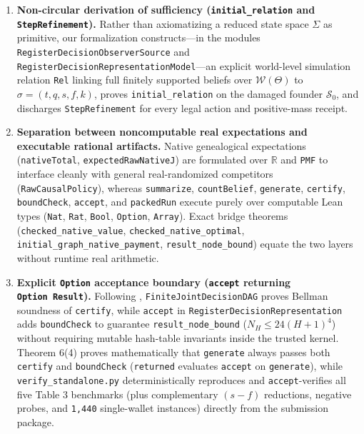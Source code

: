 \documentclass[11pt,a4paper]{article}
\providecommand{\tightlist}{\setlength{\itemsep}{2pt}\setlength{\parskip}{0pt}}
\begin{document}
\begin{enumerate}
\def\labelenumi{\arabic{enumi}.}
\tightlist
\item
  \textbf{Non-circular derivation of sufficiency
  (\texttt{initial\_relation} and \texttt{StepRefinement}).} Rather than
  axiomatizing a reduced state space \(\Sigma\) as primitive, our
  formalization constructs---in the modules
  \texttt{RegisterDecisionObserverSource} and
  \texttt{RegisterDecisionRepresentationModel}---an explicit world-level
  simulation relation \texttt{Rel} linking full finitely supported
  beliefs over \(\mathcal{W}(\Theta)\) to \(\sigma = (t, q, s, f, k)\),
  proves \texttt{initial\_relation} on the damaged founder
  \(\mathcal{S}_0\), and discharges \texttt{StepRefinement} for every
  legal action and positive-mass receipt.
\item
  \textbf{Separation between noncomputable real expectations and
  executable rational artifacts.} Native genealogical expectations
  (\texttt{nativeTotal}, \texttt{expectedRawNativeJ}) are formulated
  over \(\mathbb{R}\) and \texttt{PMF} to interface cleanly with general
  real-randomized competitors (\texttt{RawCausalPolicy}), whereas
  \texttt{summarize}, \texttt{countBelief}, \texttt{generate},
  \texttt{certify}, \texttt{boundCheck}, \texttt{accept}, and
  \texttt{packedRun} execute purely over computable Lean types
  (\texttt{Nat}, \texttt{Rat}, \texttt{Bool}, \texttt{Option},
  \texttt{Array}). Exact bridge theorems
  (\texttt{checked\_native\_value}, \texttt{checked\_native\_optimal},
  \texttt{initial\_graph\_native\_payment},
  \texttt{result\_node\_bound}) equate the two layers without runtime
  real arithmetic.
\item
  \textbf{Explicit \texttt{Option} acceptance boundary (\texttt{accept}
  returning \texttt{Option\ Result}).} Following \citep{mcconnell2011},
  \texttt{FiniteJointDecisionDAG} proves Bellman soundness of
  \texttt{certify}, while \texttt{accept} in
  \texttt{RegisterDecisionRepresentation} adds \texttt{boundCheck} to
  guarantee \texttt{result\_node\_bound} (\(N_H \le 24(H+1)^4\)) without
  requiring mutable hash-table invariants inside the trusted kernel.
  Theorem 6(4) proves mathematically that \texttt{generate} always
  passes both \texttt{certify} and \texttt{boundCheck}
  (\texttt{returned} evaluates \texttt{accept} on \texttt{generate}),
  while \texttt{verify\_standalone.py} deterministically reproduces and
  \texttt{accept}-verifies all five Table 3 benchmarks (plus
  complementary \((s - f)\) reductions, negative probes, and
  \texttt{1,440} single-wallet instances) directly from the submission
  package.
\end{enumerate}
\end{document}
